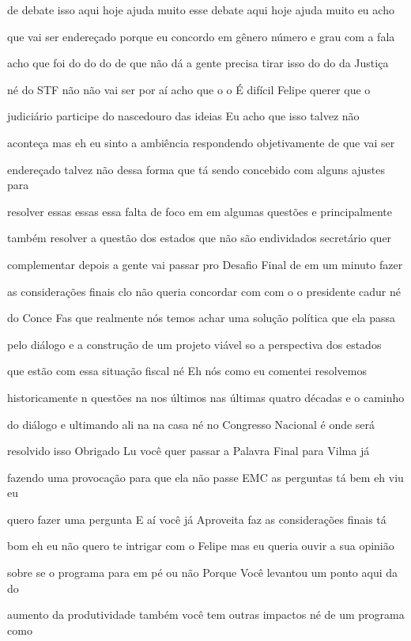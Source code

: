 \documentclass[a4paper,12pt]{article}
\begin{document}
de debate isso aqui hoje ajuda muito esse debate aqui hoje ajuda muito eu acho

que vai ser endereçado porque eu concordo em gênero número e grau com a fala

acho que foi do do do de que não dá a gente precisa tirar isso do do da Justiça

né do STF não não vai ser por aí acho que o o É difícil Felipe querer que o

judiciário participe do nascedouro das ideias Eu acho que isso talvez não

aconteça mas eh eu sinto a ambiência respondendo objetivamente de que vai ser

endereçado talvez não dessa forma que tá sendo concebido com alguns ajustes para

resolver essas essas essa falta de foco em em algumas questões e principalmente

também resolver a questão dos estados que não são endividados secretário quer

complementar depois a gente vai passar pro Desafio Final de em um minuto fazer

as considerações finais clo não queria concordar com com o o presidente cadur né

do Conce Fas que realmente nós temos achar uma solução política que ela passa

pelo diálogo e a construção de um projeto viável so a perspectiva dos estados

que estão com essa situação fiscal né Eh nós como eu comentei resolvemos

historicamente n questões na nos últimos nas últimas quatro décadas e o caminho

do diálogo e ultimando ali na na casa né no Congresso Nacional é onde será

resolvido isso Obrigado Lu você quer passar a Palavra Final para Vilma já

fazendo uma provocação para que ela não passe EMC as perguntas tá bem eh viu eu

quero fazer uma pergunta E aí você já Aproveita faz as considerações finais tá

bom eh eu não quero te intrigar com o Felipe mas eu queria ouvir a sua opinião

sobre se o programa para em pé ou não Porque Você levantou um ponto aqui da do

aumento da produtividade também você tem outras impactos né de um programa como
\end{document}
